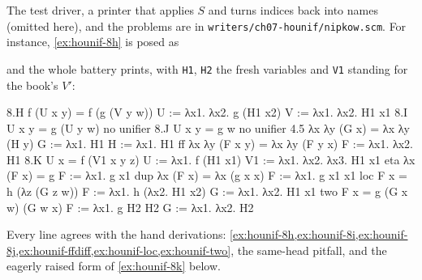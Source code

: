 The test driver, a printer that applies $S$ and turns indices back into names (omitted here), and the
problems are in \texttt{writers/ch07-hounif/nipkow.scm}. For instance, \cref{ex:hounif-8h} is posed as
and the whole battery prints, with \texttt{H1}, \texttt{H2} the fresh variables and \texttt{V1} standing for the
book's $V'$:
\begin{answers}
8.H  f (U x y) = f (g (V y w))
  U := λx1. λx2. g (H1 x2)
  V := λx1. λx2. H1 x1
8.I  U x y = g (U y w)
  no unifier
8.J  U x y = g w
  no unifier
4.5  λx λy (G x) = λx λy (H y)
  G := λx1. H1
  H := λx1. H1
ff   λx λy (F x y) = λx λy (F y x)
  F := λx1. λx2. H1
8.K  U x = f (V1 x y z)
  U := λx1. f (H1 x1)
  V1 := λx1. λx2. λx3. H1 x1
eta  λx (F x) = g
  F := λx1. g x1
dup  λx (F x) = λx (g x x)
  F := λx1. g x1 x1
loc  F x = h (λz (G z w))
  F := λx1. h (λx2. H1 x2)
  G := λx1. λx2. H1 x1
two  F x = g (G x w) (G w x)
  F := λx1. g H2 H2
  G := λx1. λx2. H2
\end{answers}
Every line agrees with the hand derivations: \cref{ex:hounif-8h,ex:hounif-8i,ex:hounif-8j,ex:hounif-ffdiff,ex:hounif-loc,ex:hounif-two},
the same-head pitfall, and the eagerly raised form of \cref{ex:hounif-8k} below.


